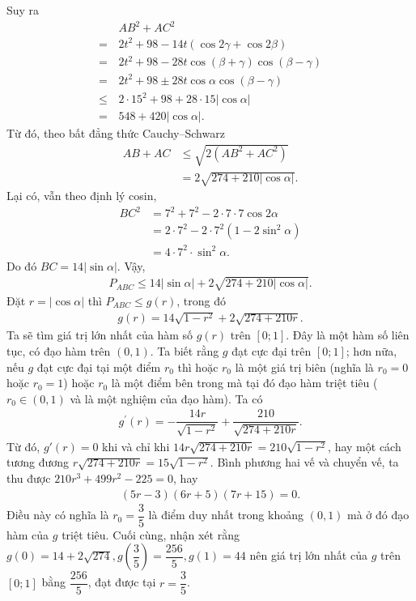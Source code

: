 \begin{multicols}{2}
	Suy ra 
	\begin{align*}
		&AB^2+AC^2\\
		= \,&2t^2+98-14t \left( \cos2\gamma +\cos 2\beta \right)\\
		= \,&2t^2+98-28t\cos (\beta+ \gamma)\cos (\beta-\gamma)\\
		= \,&2t^2+98\pm 28t\cos\alpha \cos (\beta-\gamma)\\
		\leq \,&2\cdot 15^2 + 98 + 28\cdot 15 |\cos \alpha| \\
		= \,&548+420 |\cos\alpha|.
	\end{align*}
	Từ đó, theo bất đẳng thức Cauchy--Schwarz 
	\begin{align*}
		AB+AC &\leq \sqrt{2(AB^2+AC^2)}\\
		&=2\sqrt{274+210|\cos\alpha|} . 
	\end{align*}
	Lại có, vẫn theo định lý cosin, 
	\begin{align*}
		BC^2 &=7^2+7^2-2\cdot 7\cdot 7 \cos2\alpha\\
		&= 2\cdot 7^2 - 2\cdot 7^2 (1-2\sin^2 \alpha)\\
		& = 4\cdot 7^2\cdot \sin^2\alpha.
	\end{align*}
	Do đó $BC=14 | \sin\alpha|$. Vậy,
	\begin{align*}
			P_{ABC}\leq 14| \sin\alpha|+2\sqrt{274+210|\cos\alpha|}.
	\end{align*}
	Đặt $r=|\cos\alpha|$ thì $P_{ABC}\le g(r)$, trong đó
	\begin{align*}
		g(r)=14\sqrt{1-r^2}+2\sqrt{274+210r}.
	\end{align*}
	Ta sẽ tìm giá trị lớn nhất của hàm số $g(r)$ trên $[0;1]$. Đây là một hàm số liên tục, có đạo hàm trên $(0, 1)$. Ta biết rằng $g$ đạt cực đại trên $[0; 1]$; hơn nữa, nếu $g$ đạt cực đại tại một điểm $r_0$ thì hoặc $r_0$ là một giá trị biên (nghĩa là $r_0=0$ hoặc $r_0=1$) hoặc $r_0$ là một điểm bên trong mà tại đó đạo hàm triệt tiêu ($r_0\in (0, 1)$ và là một nghiệm của đạo hàm).
	Ta có
	\begin{align*}
		g^\prime(r)=-\dfrac{14r}{\sqrt{1-r^2}}+\dfrac{210}{\sqrt{274+210r}}.
	\end{align*}
	Từ đó, $g'(r)=0$ khi và chỉ khi $14 r \sqrt{274 + 210r}= 210 \sqrt{1-r^2}$, hay một cách tương đương $ r \sqrt{274+ 210r}= 15 \sqrt{1-r^2}$. Bình phương hai vế và chuyển vế, ta thu được $210 r^3 + 499 r^2 - 225=0$, hay
	\begin{align*}
		(5r-3)(6r+5)(7r+15)=0.
	\end{align*} 
	Điều này có nghĩa là $r_0=\dfrac{3}{5}$ là điểm duy nhất trong khoảng $(0,1)$ mà ở đó đạo hàm của $g$ triệt tiêu. Cuối cùng, nhận xét rằng $g(0)= 14 + 2\sqrt{274}, g\left(\dfrac{3}{5}\right) = \dfrac{256}{5}, g(1)= 44$ nên giá trị lớn nhất của $g$ trên $[0; 1]$ bằng $\dfrac{256}{5}$, đạt được tại $r= \dfrac{3}{5}$. 

\end{multicols}
